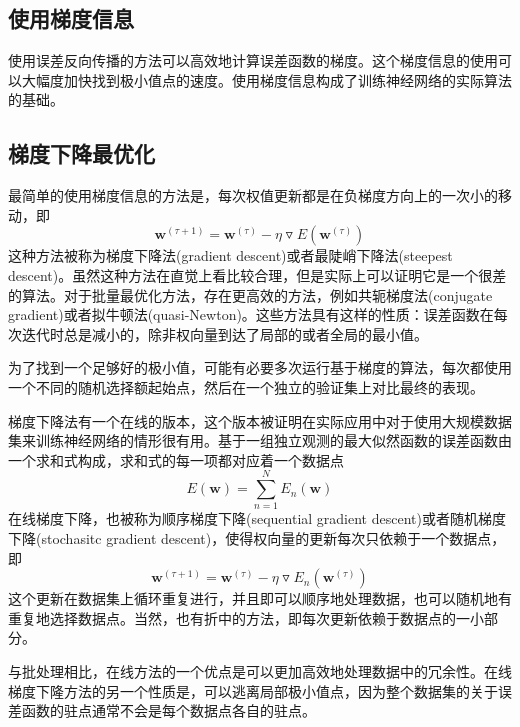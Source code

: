 \subsection*{使用梯度信息}
使用误差反向传播的方法可以高效地计算误差函数的梯度。这个梯度信息的使用可以大幅度加快找到极小值点的速度。使用梯度信息构成了训练神经网络的实际算法的基础。
\subsection*{梯度下降最优化}
最简单的使用梯度信息的方法是，每次权值更新都是在负梯度方向上的一次小的移动，即
\begin{equation}
	\boldsymbol{w}^{(\tau +1)}=\boldsymbol{w}^{(\tau)}-\eta \triangledown E(\boldsymbol{w}^{(\tau)})
\end{equation}
这种方法被称为梯度下降法(gradient descent)或者最陡峭下降法(steepest descent)。虽然这种方法在直觉上看比较合理，但是实际上可以证明它是一个很差的算法。对于批量最优化方法，存在更高效的方法，例如共轭梯度法(conjugate gradient)或者拟牛顿法(quasi-Newton)。这些方法具有这样的性质：误差函数在每次迭代时总是减小的，除非权向量到达了局部的或者全局的最小值。

为了找到一个足够好的极小值，可能有必要多次运行基于梯度的算法，每次都使用一个不同的随机选择额起始点，然后在一个独立的验证集上对比最终的表现。

梯度下降法有一个在线的版本，这个版本被证明在实际应用中对于使用大规模数据集来训练神经网络的情形很有用。基于一组独立观测的最大似然函数的误差函数由一个求和式构成，求和式的每一项都对应着一个数据点
\begin{equation}
	E(\boldsymbol{w})=\sum_{n=1}^{N}E_n(\boldsymbol{w})
\end{equation}
在线梯度下降，也被称为顺序梯度下降(sequential gradient descent)或者随机梯度下降(stochasitc gradient descent)，使得权向量的更新每次只依赖于一个数据点，即
\begin{equation}
		\boldsymbol{w}^{(\tau +1)}=\boldsymbol{w}^{(\tau)}-\eta \triangledown E_n(\boldsymbol{w}^{(\tau)})
\end{equation}
这个更新在数据集上循环重复进行，并且即可以顺序地处理数据，也可以随机地有重复地选择数据点。当然，也有折中的方法，即每次更新依赖于数据点的一小部分。

与批处理相比，在线方法的一个优点是可以更加高效地处理数据中的冗余性。在线梯度下隆方法的另一个性质是，可以逃离局部极小值点，因为整个数据集的关于误差函数的驻点通常不会是每个数据点各自的驻点。